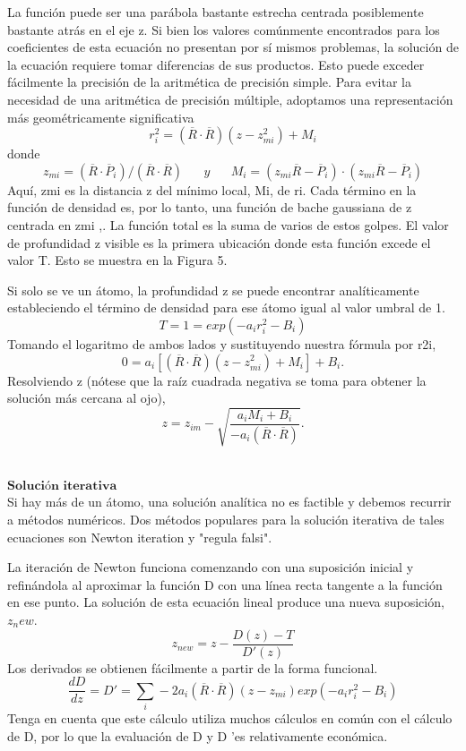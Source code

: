 La función puede ser una parábola bastante estrecha centrada posiblemente bastante atrás en el eje z. Si bien los valores comúnmente encontrados para los coeficientes de esta ecuación no presentan por sí mismos problemas, la solución de la ecuación requiere tomar diferencias de sus productos. Esto puede exceder fácilmente la precisión de la aritmética de precisión simple. Para evitar la necesidad de una aritmética de precisión múltiple, adoptamos una representación más geométricamente significativa
\[
	r^{2}_{i} = (\overline{R} \cdot \overline{R})(z - z^{2}_{mi}) + M_i
\]
donde
\[
	z_{mi} = (\overline{R} \cdot \overline{P}_i)/(\overline{R} \cdot \overline{R}) \;\;\;\;\;\; y \;\;\;\;\;\; M_i = (z_{mi} \overline{R} - \overline{P}_i) \cdot (z_{mi} \overline{R} - \overline{P}_i)
\]
Aquí, zmi es la distancia z del mínimo local, Mi, de ri. Cada término en la función de densidad es, por lo tanto, una función de bache gaussiana de z centrada en zmi ,. La función total es la suma de varios de estos golpes. El valor de profundidad z visible es la primera ubicación donde esta función excede el valor T. Esto se muestra en la Figura 5.

Si solo se ve un átomo, la profundidad z se puede encontrar analíticamente estableciendo el término de densidad para ese átomo igual al valor umbral de 1.
\[
	T = 1 = exp ( -a_i r^{2}_{i} - B_i)
\]
Tomando el logaritmo de ambos lados y sustituyendo nuestra fórmula por r2i,
\[
	0 = a_i [(\overline{R} \cdot \overline{R})(z-z^{2}_{mi}) + M_i] + B_i.
\]
Resolviendo z (nótese que la raíz cuadrada negativa se toma para obtener la solución más cercana al ojo),
\[
	z = z_{im} - \sqrt{\frac{a_i M_i + B_i}{-a_i (\overline{R} \cdot \overline{R})}}.
\]

${ }$\\
$\textbf{Solución iterativa}$
${ }$\\

Si hay más de un átomo, una solución analítica no es factible y debemos recurrir a métodos numéricos. Dos métodos populares para la solución iterativa de tales ecuaciones son Newton iteration y "regula falsi".

La iteración de Newton funciona comenzando con una suposición inicial y refinándola al aproximar la función D con una línea recta tangente a la función en ese punto. La solución de esta ecuación lineal produce una nueva suposición, $z_new$.
\[
	z_{new} = z - \frac{D(z) - T}{D'(z)}
\]
Los derivados se obtienen fácilmente a partir de la forma funcional.
\[
	\frac{dD}{dz} = D' = \sum_{i} -2 a_i (\overline{R} \cdot \overline{R}) (z - z_{mi}) exp(-a_i r^{2}_{i} - B_i)
\]
Tenga en cuenta que este cálculo utiliza muchos cálculos en común con el cálculo de D, por lo que la evaluación de D y D 'es relativamente económica.

